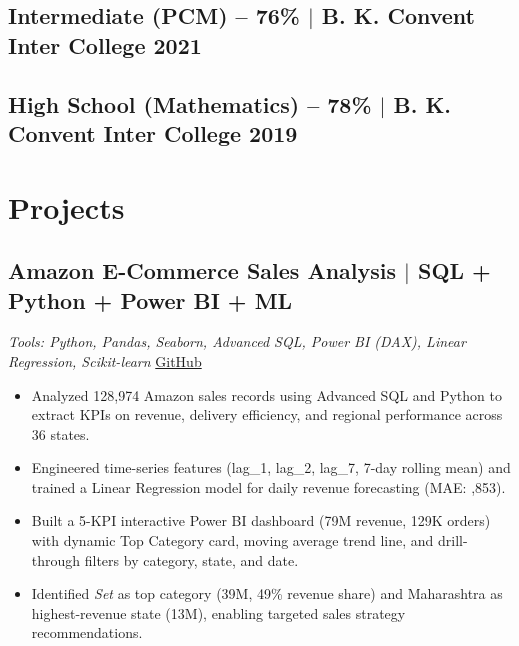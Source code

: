 \documentclass[10pt]{article}
\begin{document}
\subsection{Intermediate (PCM) -- 76\% $|$ B. K. Convent Inter College \hfill 2021}

\subsection{High School (Mathematics) -- 78\% $|$ B. K. Convent Inter College \hfill 2019}

\section{Projects}

\subsection{Amazon E-Commerce Sales Analysis $|$ SQL + Python + Power BI + ML}
\item \textit{Tools: Python, Pandas, Seaborn, Advanced SQL, Power BI (DAX), Linear Regression, Scikit-learn} \hfill \href{https://github.com/Ravindra8896/Ecommerce-Sales-Analysis-SQL.git}{GitHub}
\begin{itemize}
    \item Analyzed 128,974 Amazon sales records using Advanced SQL and Python to extract KPIs on revenue, delivery efficiency, and regional performance across 36 states.
    \item Engineered time-series features (lag\_1, lag\_2, lag\_7, 7-day rolling mean) and trained a Linear Regression model for daily revenue forecasting (MAE: ,853).
    \item Built a 5-KPI interactive Power BI dashboard (\rupee79M revenue, 129K orders) with dynamic Top Category card, moving average trend line, and drill-through filters by category, state, and date.
    \item Identified \textit{Set} as top category (\rupee39M, 49\% revenue share) and Maharashtra as highest-revenue state (\rupee13M), enabling targeted sales strategy recommendations.
\end{itemize}
\end{document}
